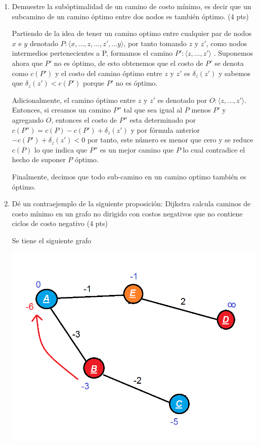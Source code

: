 \documentclass[a4paper,12pt]{article}
\begin{document}
\begin{enumerate}

\item Demuestre la subóptimalidad de un camino de costo mínimo, es decir que un subcamino de un camino óptimo entre dos nodos es también óptimo. (4 pts)

Partiendo de la idea de tener un camino optimo entre cualquier par de nodos $x$ e $y$ denotado $P:\langle x, ..., z,..., z', ... y \rangle$, por tanto tomando $z$ y $z'$, como nodos intermedios pertenecientes a P, formamos el camino $P': \langle z, ..., z' \rangle$ . Suponemos ahora que $P'$ no es óptimo, de esto obtenemos que el costo de $P'$ se denota como $c(P')$ y el costo del camino óptimo entre $z$ y $z'$ es $\delta_z(z')$ y sabemos que $\delta_z(z') < c(P')$ porque $P'$ no es óptimo. 

Adicionalmente, el camino óptimo entre $z$ y $z'$ es denotado por $O: \langle z,..., z' \rangle$. Entonces, si creamos un camino $P''$ tal que sea igual al $P$ menos $P'$ y agregando $O$, entonces el costo de $P''$ esta determinado por $c(P'') = c(P)-c(P')+\delta_z(z')$  y por fórmula anterior $-c(P')+\delta_z(z') < 0$ por tanto, este número es menor que cero y se reduce $c(P)$ lo que indica que $P''$ es un mejor camino que $P$ lo cual contradice el hecho de suponer $P$ óptimo.

Finalmente, decimos que todo sub-camino en un camino optimo también es óptimo.

\item Dé un contraejemplo de la siguiente proposición: Dijkstra calcula caminos de costo mínimo en un grafo no dirigido con costos negativos que no contiene ciclos de costo negativo (4 pts)

Se tiene el siguiente grafo
\begin{center}
\par \includegraphics[scale=0.8]{g1p2} \par
\end{center}


\end{enumerate}
\end{document}
